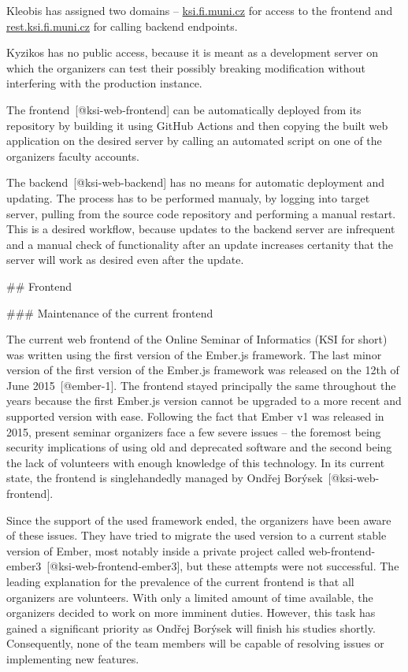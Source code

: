 \documentclass[
  digital, %
  oneside, %
  lof,     %
  nolot,     %
]{fithesis4}
\begin{document}
Kleobis has assigned two domains -- \href{https://ksi.fi.muni.cz}{ksi.fi.muni.cz} for access to the frontend and \href{https://rest.ksi.fi.muni.cz}{rest.ksi.fi.muni.cz} for calling backend endpoints.

Kyzikos has no public access, because it is meant as a development server on which the organizers can test their possibly breaking modification without interfering with the production instance.

The frontend~[@ksi-web-frontend] can be automatically deployed from its repository by building it using GitHub Actions and then copying the built web application on the desired server by calling an automated script on one of the organizers faculty accounts.

The backend~[@ksi-web-backend] has no means for automatic deployment and updating. The process has to be performed manualy, by logging into target server, pulling from the source code repository and performing a manual restart. This is a desired workflow, because updates to the backend server are infrequent and a manual check of functionality after an update increases certanity that the server will work as desired even after the update.

## Frontend

### Maintenance of the current frontend

The current web frontend of the Online Seminar of Informatics (KSI for short) was written using the first version of the Ember.js framework. The last minor version of the first version of the Ember.js framework was released on the 12th of June 2015~[@ember-1]. The frontend stayed principally the same throughout the years because the first Ember.js version cannot be upgraded to a more recent and supported version with ease. Following the fact that Ember v1 was released in 2015, present seminar organizers face a few severe issues -- the foremost being security implications of using old and deprecated software and the second being the lack of volunteers with enough knowledge of this technology. In its current state, the frontend is singlehandedly managed by Ondřej Borýsek~[@ksi-web-frontend].

Since the support of the used framework ended, the organizers have been aware of these issues. They have tried to migrate the used version to a current stable version of Ember, most notably inside a private project called web-frontend-ember3~[@ksi-web-frontend-ember3], but these attempts were not successful. The leading explanation for the prevalence of the current frontend is that all organizers are volunteers. With only a limited amount of time available, the organizers decided to work on more imminent duties. However, this task has gained a significant priority as Ondřej Borýsek will finish his studies shortly. Consequently, none of the team members will be capable of resolving issues or implementing new features.
\end{document}
